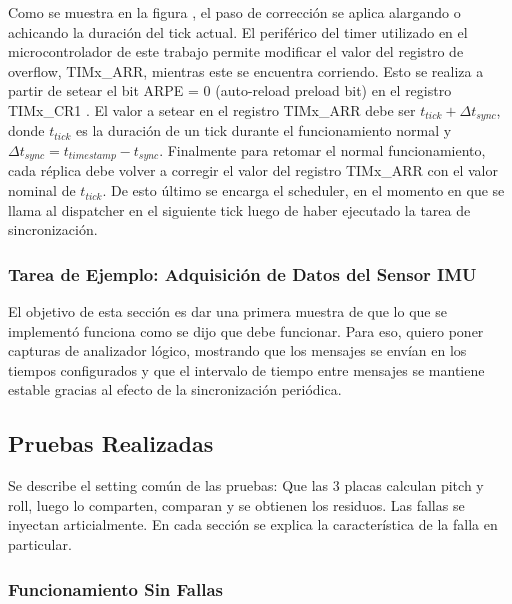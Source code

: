 
Como se muestra en la figura , el paso de corrección se aplica alargando o achicando la duración del tick actual. El periférico del timer utilizado en el microcontrolador de este trabajo permite modificar el valor del registro de overflow, TIMx\_ARR, mientras este se encuentra corriendo. Esto se realiza a partir de setear el bit ARPE = 0 (auto-reload preload bit) en el registro TIMx\_CR1 \cite[p.~745]{RM0385}. El valor a setear en el registro TIMx\_ARR debe ser $t_{tick} + \Delta t_{sync}$, donde $t_{tick}$ es la duración de un tick durante el funcionamiento normal y $\Delta t_{sync} = t_{timestamp} - t_{sync}$.
Finalmente para retomar el normal funcionamiento, cada réplica debe volver a corregir el valor del registro TIMx\_ARR con el valor nominal de $t_{tick}$. De esto último se encarga el scheduler, en el momento en que se llama al dispatcher en el siguiente tick luego de haber ejecutado la tarea de sincronización.

\subsubsection{Tarea de Ejemplo: Adquisición de Datos del Sensor IMU}

El objetivo de esta sección es dar una primera muestra de que lo que se implementó funciona como se dijo que debe funcionar. Para eso, quiero poner capturas de analizador lógico, mostrando que los mensajes se envían en los tiempos configurados y que el intervalo de tiempo entre mensajes se mantiene estable gracias al efecto de la sincronización periódica.

\subsection{Pruebas Realizadas}

Se describe el setting común de las pruebas: Que las 3 placas calculan pitch y roll, luego lo comparten, comparan y se obtienen los residuos. Las fallas se inyectan articialmente. En cada sección se explica la característica de la falla en particular.

\subsubsection{Funcionamiento Sin Fallas}

